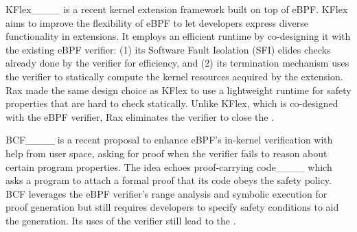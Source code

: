 KFlex____ is a recent kernel extension framework built on top of eBPF.
KFlex aims to improve the flexibility of eBPF to let developers express diverse functionality in extensions.
It employs an efficient runtime by co-designing it with the existing eBPF verifier: (1) its Software Fault Isolation (SFI)
    elides checks already done by the verifier for efficiency,
    and (2) its termination mechanism uses the verifier to
    statically compute the kernel resources acquired by the extension.
Rax made the same design choice as KFlex to use a lightweight runtime for safety properties that are hard to
    check statically.
Unlike KFlex, which is co-designed with the eBPF verifier,
    Rax eliminates the verifier to close the \gap{}.

BCF____ is a recent proposal to enhance eBPF's in-kernel verification
    with help from user space, asking for proof when the
    verifier fails to reason about certain program properties.
The idea echoes proof-carrying code____ which asks a program to attach a formal proof
    that its code obeys the safety policy.
BCF leverages the eBPF verifier's range analysis and symbolic execution for proof
    generation but still requires developers to specify safety conditions to aid the generation.
Its uses of the verifier still lead to the \gap{}.




